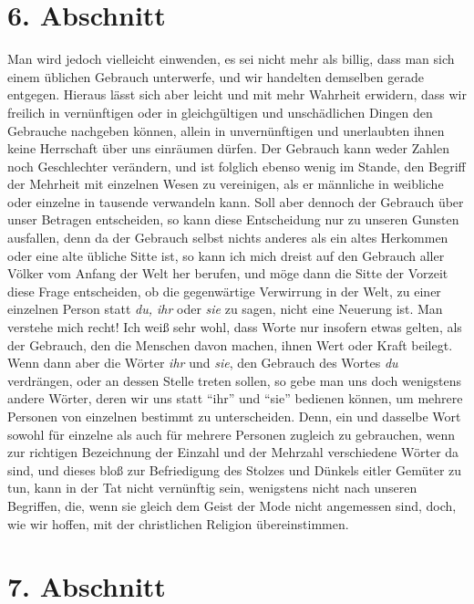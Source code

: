 \section{6. Abschnitt} \label{kap10_ab6}

Man wird jedoch vielleicht einwenden, es sei
nicht mehr als billig, dass man sich
einem üblichen Gebrauch unterwerfe, und wir handelten demselben gerade
entgegen. Hieraus lässt sich aber leicht und mit mehr Wahrheit erwidern, dass
wir freilich in vernünftigen oder in gleichgültigen und unschädlichen Dingen den
Gebrauche nachgeben können, allein in unvernünftigen und unerlaubten ihnen keine
Herrschaft über uns einräumen dürfen. Der Gebrauch kann weder Zahlen noch
Geschlechter verändern, und ist folglich ebenso wenig im Stande, den Begriff
der Mehrheit mit einzelnen Wesen zu vereinigen, als er männliche in weibliche
oder einzelne in tausende verwandeln kann. Soll aber dennoch der Gebrauch über
unser Betragen entscheiden, so kann diese Entscheidung nur zu unseren Gunsten
ausfallen, denn da der Gebrauch selbst nichts anderes als ein altes Herkommen
oder eine alte übliche Sitte ist, so kann ich mich dreist auf den Gebrauch aller
Völker vom Anfang der Welt her berufen, und möge dann die Sitte der Vorzeit
diese Frage entscheiden, ob die gegenwärtige Verwirrung in der Welt, zu einer
einzelnen Person statt \textit{du, ihr} oder \textit{sie} zu sagen, nicht eine
Neuerung
ist. Man verstehe mich recht! Ich weiß sehr wohl,
dass Worte nur insofern etwas
gelten, als der Gebrauch, den die Menschen davon machen, ihnen Wert oder Kraft
beilegt. Wenn dann aber die Wörter \textit{ihr} und \textit{sie}, den Gebrauch
des Wortes
\textit{du} verdrängen, oder an dessen Stelle treten sollen, so gebe man uns
doch
wenigstens andere Wörter, deren wir uns statt "`ihr"' und "`sie"' bedienen
können, um
mehrere Personen von einzelnen bestimmt zu unterscheiden. Denn, ein und dasselbe
Wort sowohl für einzelne als auch für mehrere Personen zugleich zu gebrauchen,
wenn zur richtigen Bezeichnung der Einzahl und der Mehrzahl verschiedene Wörter
da sind, und dieses bloß zur Befriedigung des Stolzes und Dünkels eitler
Gemüter zu tun, kann in der Tat nicht vernünftig sein, wenigstens nicht nach
unseren Begriffen, die, wenn sie gleich dem Geist der Mode nicht angemessen
sind, doch, wie wir hoffen, mit der christlichen Religion übereinstimmen.

\section{7. Abschnitt} \label{kap10_ab7}

